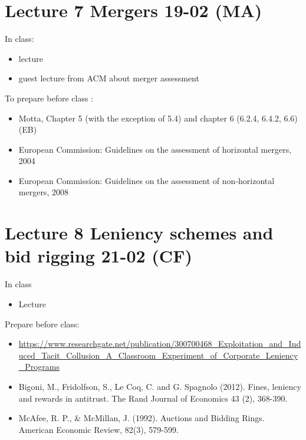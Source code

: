 \documentclass[]{book}
\providecommand{\tightlist}{%
  \setlength{\itemsep}{0pt}\setlength{\parskip}{0pt}}
\begin{document}
\section{Lecture 7 Mergers 19-02 (MA)}\label{lecture-7-mergers-19-02-ma}

In class:

\begin{itemize}
\tightlist
\item
  lecture
\item
  guest lecture from ACM about merger assessment
\end{itemize}

To prepare before class :

\begin{itemize}
\tightlist
\item
  Motta, Chapter 5 (with the exception of 5.4) and chapter 6 (6.2.4,
  6.4.2, 6.6) (EB)
\item
  European Commission: Guidelines on the assessment of horizontal
  mergers, 2004
\item
  European Commission: Guidelines on the assessment of non-horizontal
  mergers, 2008
\end{itemize}

\section{Lecture 8 Leniency schemes and bid rigging 21-02
(CF)}\label{lecture-8-leniency-schemes-and-bid-rigging-21-02-cf}

In class

\begin{itemize}
\tightlist
\item
  Lecture
\end{itemize}

Prepare before class:

\begin{itemize}
\tightlist
\item
  \url{https://www.researchgate.net/publication/300700468_Exploitation_and_Induced_Tacit_Collusion_A_Classroom_Experiment_of_Corporate_Leniency_Programs}
\item
  Bigoni, M., Fridolfson, S., Le Coq, C. and G. Spagnolo (2012). Fines,
  leniency and rewards in antitrust. The Rand Journal of Economics 43
  (2), 368-390.
\item
  McAfee, R. P., \& McMillan, J. (1992). Auctions and Bidding Rings.
  American Economic Review, 82(3), 579-599.
\end{itemize}
\end{document}
